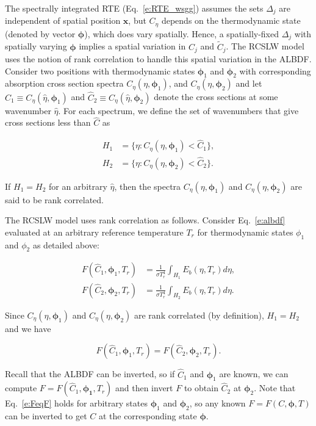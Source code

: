 \documentclass[preprint,12pt]{elsarticle}
\newcommand{\BS}{\boldsymbol}
\begin{document}
The spectrally integrated RTE (Eq.~\ref{e:RTE_wsgg}) assumes the sets $\Delta_j$ are independent of spatial position $\mathbf{x}$, but $C_\eta$ depends on the thermodynamic state (denoted by vector $\BS{\phi}$), which does vary spatially.
Hence, a spatially-fixed $\Delta_j$ with spatially varying $\BS{\phi}$ implies a spatial variation in $C_j$ and $\tilde{C}_j$.
The RCSLW model uses the notion of rank correlation to handle this spatial variation in the ALBDF.
Consider two positions with thermodynamic states $\BS{\phi}_1$ and $\BS{\phi}_2$ with corresponding absorption cross section spectra $C_\eta(\eta,\BS{\phi}_1)$, and $C_\eta(\eta,\BS{\phi}_2)$ and let $\hat{C}_1\equiv C_\eta(\hat{\eta},\BS{\phi}_1)$ and $\hat{C}_2\equiv C_\eta(\hat{\eta},\BS{\phi}_2)$ denote the cross sections at some wavenumber $\hat{\eta}$. For each spectrum, we define the set of wavenumbers that give cross sections less than $\hat{C}$ as
%
\begin{linenomath}
\begin{align}
H_1&=\{\eta: C_\eta(\eta,\BS{\phi}_1)<\hat{C}_1\}, \\
H_2&=\{\eta: C_\eta(\eta,\BS{\phi}_2)<\hat{C}_2\}.
\end{align}
\end{linenomath}
%
If $H_1=H_2$ for an arbitrary $\hat{\eta}$, then the spectra $C_\eta(\eta,\BS{\phi}_1)$ and $C_\eta(\eta,\BS{\phi}_2)$ are said to be rank correlated.

The RCSLW model uses rank correlation as follows.
Consider Eq.~\ref{e:albdf} evaluated at an arbitrary reference temperature $T_r$ for thermodynamic states $\phi_1$ and $\phi_2$ as detailed above:
%
\begin{linenomath}
\begin{align} \label{e:albdf2}
F(\hat{C}_1,\BS{\phi}_1,T_r) &= \frac{1}{\sigma T_r^4}\int_{H_1}E_b(\eta,T_r)d\eta, \\
F(\hat{C}_2,\BS{\phi}_2,T_r) &= \frac{1}{\sigma T_r^4}\int_{H_2}E_b(\eta,T_r)d\eta.
\end{align}
\end{linenomath}
%
Since $C_\eta(\eta,\BS{\phi}_1)$ and $C_\eta(\eta,\BS{\phi}_2)$ are rank correlated (by definition), $H_1=H_2$ and we have
%
\begin{linenomath}
\begin{equation} \label{e:FeqF}
F(\hat{C}_1,\BS{\phi}_1,T_r)=F(\hat{C}_2,\BS{\phi}_2,T_r).
\end{equation}
\end{linenomath}
%
Recall that the ALBDF can be inverted, so if $\hat{C}_1$ and $\BS{\phi}_1$ are known, we can compute $F=F(\hat{C}_1,\BS{\phi_1},T_r)$ and then invert $F$ to obtain $\hat{C}_2$ at $\BS{\phi}_2$. Note that Eq.~\ref{e:FeqF} holds for arbitrary states $\BS{\phi}_1$ and $\BS{\phi}_2$, so any known $F=F(C,\BS{\phi},T)$ can be inverted to get $C$ at the corresponding state $\BS{\phi}$.
\end{document}
